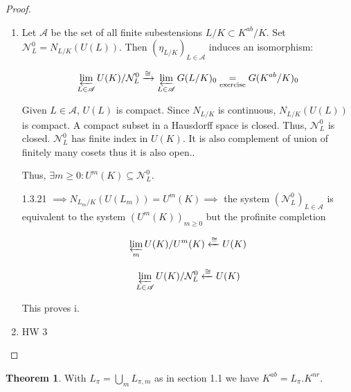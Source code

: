 \documentclass{article}
\theoremstyle{definition}
\newtheorem{theorem}{Theorem}
\numberwithin{theorem}{subsection}
\begin{document}
    \begin{proof}
        \begin{enumerate}[label=\roman*)]
            \item Let \(\mathscr{A}\) be the set of all finite subestensions \(L / K \subset K^{ab} / K\).
            Set \(\mathcal{N}_L^0 = N_{L / K}(U(L))\). Then \((\eta_{L / K})_{L \in \mathscr{A}}\) induces an isomorphism:

            \[
                \varprojlim_{L \in \mathscr{A}} U(K) / \mathcal{N}^0_L \xrightarrow{\cong} \varprojlim_{L \in \mathscr{A}} G(L / K)_0 \underset{\text{exercise}}{=} G(K^{ab} / K)_0
            \]

            Given \(L\in \mathscr{A}\), \(U(L)\) is compact. Since \(N_{L / K}\) is continuous, \(N_{L / K}(U(L))\) is compact. A compact subset in a Hausdorff space is closed. Thus, \(\mathcal{N}_L^0\) is closed. \(\mathcal{N}_L^0\) has finite index in \(U(K)\). It is also complement of union of finitely many cosets thus it is also open..

            Thus, \(\exists m \geq 0 : U^m(K) \subseteq \mathcal{N}_L^0\).

            1.3.21 \(\implies N_{L_m / K}(U(L_m)) = U^m(K) \implies\) the system \((\mathcal{N}_L^0)_{L\in \mathscr{A}}\) is equivalent to the system \((U^m(K))_{m\geq 0}\) but the profinite completion 
                
            \[
                \varprojlim_{m} U(K) / U^m(K) \xleftarrow{\cong} U(K)
            \]

            \[
                \varprojlim_{L\in \mathscr{A}} U(K) / \mathcal{N}_L^0 \xleftarrow{\cong} U(K)
            \]

            This proves i.
                
            \item HW 3
        \end{enumerate} 
    \end{proof}

    \begin{theorem}
        With \(L_\pi = \bigcup_{m} L_{\pi, m}\) as in section 1.1 we have \(K^{ab} = L_\pi . K^{nr}\). 
    \end{theorem}
\end{document}
